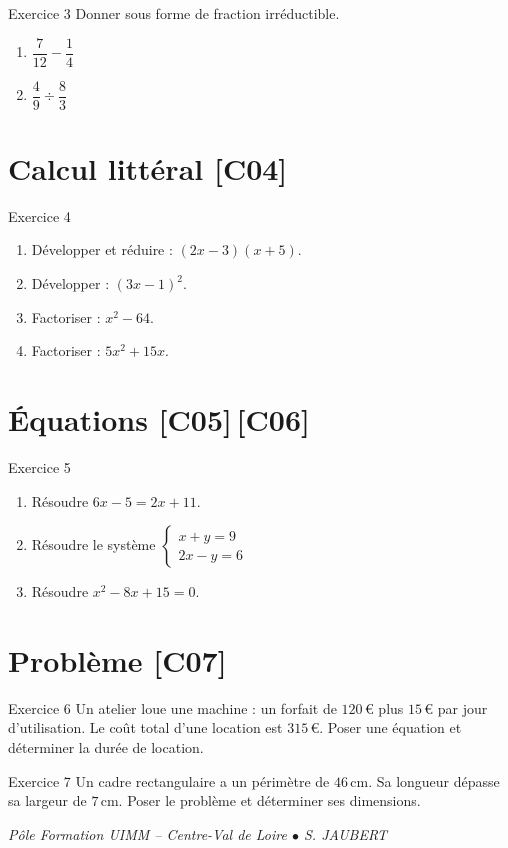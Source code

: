 \documentclass[a4paper,11pt]{article}
\begin{document}
\begin{exo}{Exercice 3}
Donner sous forme de fraction irréductible.
\begin{enumerate}[label=\alph*)]
  \item $\dfrac{7}{12} - \dfrac{1}{4}$
  \item $\dfrac{4}{9} \div \dfrac{8}{3}$
\end{enumerate}
\end{exo}

\section{Calcul littéral \hfill {\normalsize\color{uimmred}[C04]}}
\begin{exo}{Exercice 4}
\begin{enumerate}[label=\alph*)]
  \item Développer et réduire : $(2x - 3)(x + 5)$.
  \item Développer : $(3x - 1)^2$.
  \item Factoriser : $x^2 - 64$.
  \item Factoriser : $5x^2 + 15x$.
\end{enumerate}
\end{exo}

\section{Équations \hfill {\normalsize\color{uimmred}[C05]\,[C06]}}
\begin{exo}{Exercice 5}
\begin{enumerate}[label=\alph*)]
  \item Résoudre $6x - 5 = 2x + 11$.
  \item Résoudre le système $\begin{cases} x + y = 9 \\ 2x - y = 6 \end{cases}$
  \item Résoudre $x^2 - 8x + 15 = 0$.
\end{enumerate}
\end{exo}

\section{Problème \hfill {\normalsize\color{uimmred}[C07]}}
\begin{exo}{Exercice 6}
Un atelier loue une machine : un forfait de $120\,$€ plus $15\,$€ par jour d'utilisation. Le coût total d'une location est $315\,$€. Poser une équation et déterminer la durée de location.
\end{exo}

\begin{exo}{Exercice 7}
Un cadre rectangulaire a un périmètre de $46\,$cm. Sa longueur dépasse sa largeur de $7\,$cm. Poser le problème et déterminer ses dimensions.
\end{exo}

\vfill
\begin{center}\color{uimmgray}\small
\textit{Pôle Formation UIMM -- Centre-Val de Loire $\bullet$ S. JAUBERT}
\end{center}
\end{document}
